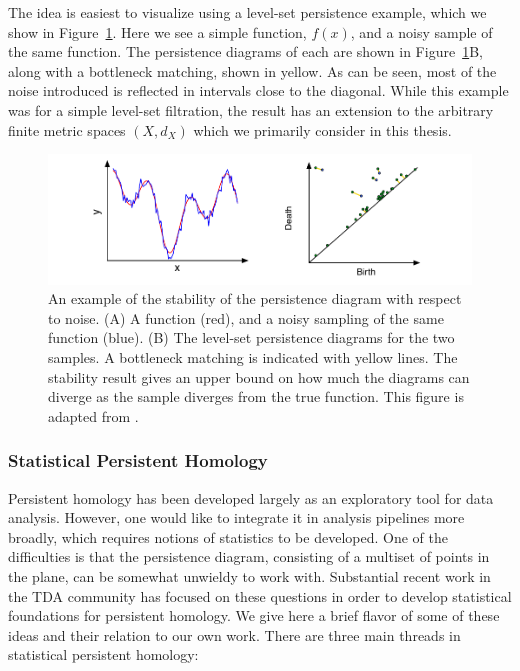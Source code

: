 The idea is easiest to visualize using a level-set persistence example, which we show in Figure~\ref{fig:bg:stability_example}.
Here we see a simple function, $f(x)$, and a noisy sample of the same function.
The persistence diagrams of each are shown in Figure~\ref{fig:bg:stability_example}B, along with a bottleneck matching, shown in yellow.
As can be seen, most of the noise introduced is reflected in intervals close to the diagonal.
While this example was for a simple level-set filtration, the result has an extension to the arbitrary finite metric spaces $(X,d_{X})$ which we primarily consider in this thesis.

\begin{figure}
	\centering
	\includegraphics[]{fig/background/stability_example.pdf}
	\caption[The stability of persistent homology under noise]{An example of the stability of the persistence diagram with respect to noise. (A) A function (red), and a noisy sampling of the same function (blue). (B) The level-set persistence diagrams for the two samples. A bottleneck matching is indicated with yellow lines. The stability result gives an upper bound on how much the diagrams can diverge as the sample diverges from the true function. This figure is adapted from \cite{Edelsbrunner:2010}.}
	\label{fig:bg:stability_example}
\end{figure}

\subsubsection{Statistical Persistent Homology}
\label{bg:tda:ph:statistics}

Persistent homology has been developed largely as an exploratory tool for data analysis.
However, one would like to integrate it in analysis pipelines more broadly, which requires notions of statistics to be developed.
One of the difficulties is that the persistence diagram, consisting of a multiset of points in the plane, can be somewhat unwieldy to work with.
Substantial recent work in the TDA community has focused on these questions in order to develop statistical foundations for persistent homology.
We give here a brief flavor of some of these ideas and their relation to our own work.
There are three main threads in statistical persistent homology:

